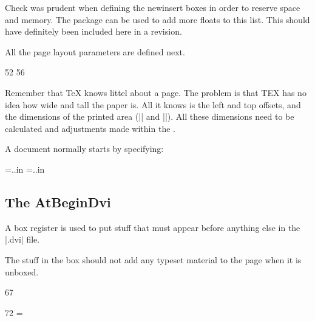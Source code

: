 \begin{multicols}{2}
Check was prudent when defining the newinsert boxes in order to reserve space and memory. The package  can be used to add more floats to this list. This should have definitely been included here in a revision.

 All the page layout parameters are defined next. 

\begin{Code}
52 \newdimen{} \newdimen{} \newdimen{} \let\@themargin=\oddsidemargin
56 \newdimen{} \newdimen{} \newdimen{} \newdimen{} \newdimen{} \newdimen{} \newdimen{} \newdimen{} \newdimen{} \newdimen{} \newdimen\marginparpush
\end{Code}

Remember  that TeX knows littel about a page. The problem is that TEX has no idea how
wide and tall the paper is. All it knows is the
left and top offsets, and the dimensions of the
printed area (|\hsize| and |\vsize|). All these dimensions need to be calculated and adjustments made within the \otr.

A document normally  starts by specifying:

\begin{Code}
\newdimen\paperheight
\newdimen\paperwidth
\paperheight=..in \paperwidth=..in
\end{Code}


\end{multicols}


\subsection*{The AtBeginDvi}
A box register is used  to put stuff that must appear before anything else
in the |.dvi| file.

The stuff in the box should not add any typeset material to the page when it
is unboxed.


\begin{teXXX}
67 \newbox{} \def \AtBeginDvi #1{%
69 \global \setbox \@begindvibox
70 \vbox{\unvbox \@begindvibox #1}%
71 }
\end{teXXX}

\begin{Code}
72 \newdimen{} \@maxdepth = \maxdepth
\end{Code}


